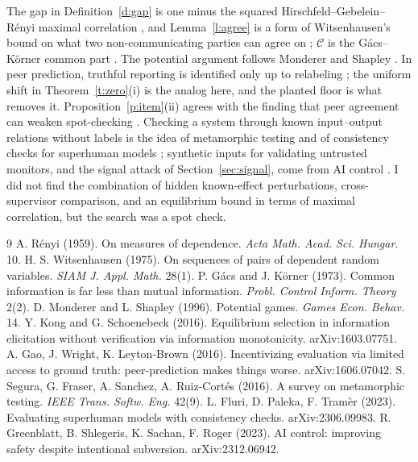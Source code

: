 \documentclass[11pt]{article}
\theoremstyle{definition}
\theoremstyle{remark}
\newcommand{\cC}{\mathcal{C}}
\begin{document}
The gap in Definition~\ref{d:gap} is one minus the squared Hirschfeld--Gebelein--Rényi maximal correlation \cite{renyi}, and Lemma~\ref{l:agree} is a form of Witsenhausen's bound on what two non-communicating parties can agree on \cite{witsenhausen}; $\cC$ is the Gács--Körner common part \cite{gk}. The potential argument follows Monderer and Shapley \cite{ms}. In peer prediction, truthful reporting is identified only up to relabeling \cite{ks}; the uniform shift in Theorem~\ref{t:zero}(i) is the analog here, and the planted floor is what removes it. Proposition~\ref{p:item}(ii) agrees with the finding that peer agreement can weaken spot-checking \cite{gao}. Checking a system through known input--output relations without labels is the idea of metamorphic testing \cite{segura} and of consistency checks for superhuman models \cite{fluri}; synthetic inputs for validating untrusted monitors, and the signal attack of Section~\ref{sec:signal}, come from AI control \cite{control}. I did not find the combination of hidden known-effect perturbations, cross-supervisor comparison, and an equilibrium bound in terms of maximal correlation, but the search was a spot check.

\begin{thebibliography}{9}\small
{} A. Rényi (1959). On measures of dependence. \emph{Acta Math. Acad. Sci. Hungar.} 10.
 H. S. Witsenhausen (1975). On sequences of pairs of dependent random variables. \emph{SIAM J. Appl. Math.} 28(1).
 P. Gács and J. Körner (1973). Common information is far less than mutual information. \emph{Probl. Control Inform. Theory} 2(2).
 D. Monderer and L. Shapley (1996). Potential games. \emph{Games Econ. Behav.} 14.
 Y. Kong and G. Schoenebeck (2016). Equilibrium selection in information elicitation without verification via information monotonicity. arXiv:1603.07751.
 A. Gao, J. Wright, K. Leyton-Brown (2016). Incentivizing evaluation via limited access to ground truth: peer-prediction makes things worse. arXiv:1606.07042.
 S. Segura, G. Fraser, A. Sanchez, A. Ruiz-Cortés (2016). A survey on metamorphic testing. \emph{IEEE Trans. Softw. Eng.} 42(9).
 L. Fluri, D. Paleka, F. Tramèr (2023). Evaluating superhuman models with consistency checks. arXiv:2306.09983.
 R. Greenblatt, B. Shlegeris, K. Sachan, F. Roger (2023). AI control: improving safety despite intentional subversion. arXiv:2312.06942.
\end{thebibliography}
\end{document}
